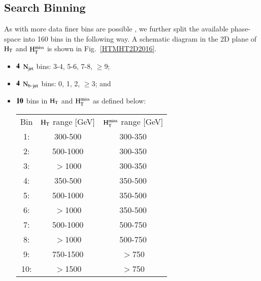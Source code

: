 \subsection{Search Binning}

As with more data finer bins are possible , we further split the available phase-space into 160 bins in the following way. A schematic diagram in the 2D plane of $\rm H_{T}$ and $\rm H_{T}^{miss}$ is shown in Fig.~\ref{HTMHT2D2016}. \vspace{-0.2in}

\begin{itemize}\vspace{-0.2in}

 \item ${\bf 4 }$ $\rm N_{jet}$ bins: 3-4, 5-6, 7-8, $\geq$9; \vspace{-0.2in}
 \item ${\bf 4 }$ $\rm N_{b\texttt{-}jet}$ bins: 0, 1, 2, $\geq$3; and \vspace{-0.2in}
 \item  ${\bf 10 }$ bins in $\rm H_{T}$ and $\rm H_{T}^{miss}$ as defined below:



\begin{center} \label{HTMHT2D2016}
\begin{tabular}{ c c c }
 Bin & $\rm H_{T}$ range [GeV] & $\rm H_{T}^{miss}$ range [GeV] \\ 
  1: & 300-500 & 300-350 \\ 

  2: & 500-1000 & 300-350 \\  

  3: & $>$1000 & 300-350\\

  4:&  350-500 & 350-500\\

  5: & 500-1000 & 350-500\\

  6: & $>$1000 & 350-500\\

  7: & 500-1000 & 500-750\\

  8: & $>$1000 & 500-750\\

  9: & 750-1500 & $>$750\\

 10: & $>$1500 & $>$750\\


\end{tabular}
\end{center}

\end{itemize}
 


